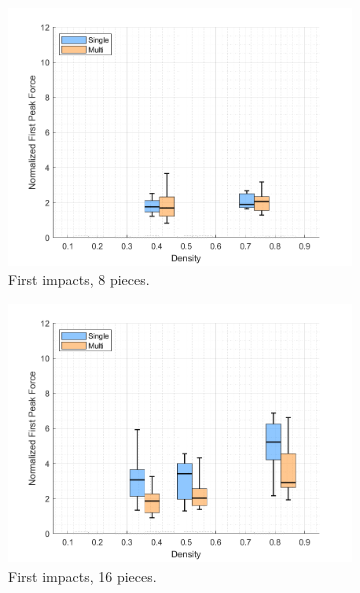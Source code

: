 \documentclass{article}
\begin{document}
\begin{figure}[htbp]
    \centering
    \begin{subfigure}[b]{0.32\textwidth}
        \centering
        \includegraphics[width=\textwidth]{Boxplot_Density_vs_PeakValues_8Debris.png}
        \caption{First impacts, 8 pieces.}
        \label{fig:boxplot_8}
    \end{subfigure}
    \hfill
    \begin{subfigure}[b]{0.32\textwidth}
        \centering
        \includegraphics[width=\textwidth]{Boxplot_Density_vs_PeakValues_16Debris.png}
        \caption{First impacts, 16 pieces.}
        \label{fig:boxplot_16}
    \end{subfigure}
    \hfill
    \begin{subfigure}[b]{0.32\textwidth}

\end{subfigure}
\end{figure}
\end{document}
